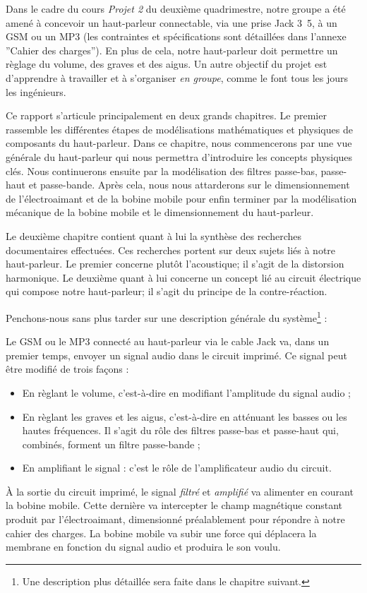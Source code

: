 

Dans le cadre du cours \textit{Projet 2} du deuxième quadrimestre, notre groupe a été amené à 
concevoir un haut-parleur connectable, via une prise Jack \unit{3.5}{\milli\meter}, à un 
GSM ou un MP3 (les contraintes et spécifications sont détaillées dans l'annexe ''Cahier des charges''). 
En plus de cela, notre haut-parleur doit permettre un règlage du volume, des graves
et des aigus. Un autre objectif du projet est d'apprendre à travailler et à s'organiser \textit{en groupe}, 
comme le font tous les jours les ingénieurs.

Ce rapport s'articule principalement en deux grands chapitres. Le premier
rassemble les différentes étapes de modélisations mathématiques
et physiques de composants du haut-parleur. Dans ce chapitre, nous 
commencerons par une vue générale du haut-parleur qui nous
permettra d'introduire les concepts physiques clés. Nous continuerons
ensuite par la modélisation des filtres passe-bas, passe-haut et passe-bande.
Après cela, nous nous attarderons  sur le dimensionnement de l'électroaimant et de la bobine mobile pour enfin terminer par la modélisation mécanique de la bobine
mobile et le dimensionnement du haut-parleur.

Le deuxième chapitre contient quant à lui la synthèse des recherches documentaires
effectuées. Ces recherches portent sur deux sujets liés à notre haut-parleur. Le premier
concerne plutôt l'acoustique; il s'agit de la 
distorsion harmonique. Le deuxième quant à lui concerne un concept lié au circuit électrique qui
compose notre haut-parleur; il s'agit du principe de la contre-réaction.

Penchons-nous sans plus tarder sur une description générale du système\footnote{Une
description plus détaillée sera faite dans le chapitre suivant.} :

Le GSM ou le MP3 connecté au haut-parleur via le cable Jack va, dans un premier temps, envoyer un signal audio dans le 
circuit imprimé. Ce signal peut être modifié de trois façons :

\begin{itemize}
	\item En règlant le volume, c'est-à-dire en modifiant l'amplitude du signal audio ;
	\item En règlant les graves et les aigus, c'est-à-dire en atténuant les basses ou les hautes
	fréquences. Il s'agit du rôle des filtres passe-bas et passe-haut qui, combinés, forment un filtre 
	passe-bande ;
 \item En amplifiant le signal : c'est le rôle de l'amplificateur audio du circuit.
\end{itemize}
 
À la sortie du circuit imprimé, le signal \textit{filtré} et \textit{amplifié} va alimenter en courant la bobine mobile.
Cette dernière va intercepter le champ magnétique constant produit par l'électroaimant, dimensionné préalablement
pour répondre à notre cahier des charges. La bobine mobile va subir une force qui déplacera la membrane en fonction
du signal audio et produira le son voulu.


